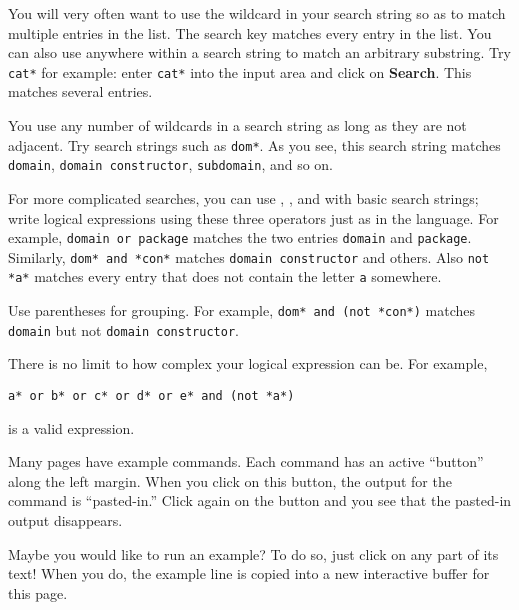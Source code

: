 You will very often want to use the wildcard \spadSyntax{*} in your search
string so as to match multiple entries in the list.
The search key \spadSyntax{*}  matches every entry in the list.
You can also use \spadSyntax{*} anywhere within a search string to match an
arbitrary substring.
Try {\tt cat*} for example:
enter {\tt cat*} into the input area and click on {\bf Search}.
This matches several entries.

You use any number of wildcards in a search string as long as they are
not adjacent.
Try search strings such as {\tt *dom*}.
As you see, this search string  matches {\tt domain}, {\tt domain
constructor}, {\tt subdomain}, and so on.


For more complicated searches, you can use
, , and 
with basic search strings;
write logical expressions using these three operators just as
in the \Language{} language.
For example, {\tt domain or package}  matches the two
entries {\tt domain} and {\tt package}.
Similarly, {\tt dom* and *con*} matches {\tt domain constructor}
and others.
Also {\tt not *a*} matches every entry that does not contain
the letter {\tt a} somewhere.

Use parentheses for grouping.
For example, {\tt dom* and (not *con*)}
matches {\tt domain} but not {\tt domain constructor}.

There is no limit to how complex your logical expression can be.
For example,
\begin{center}
{\tt a* or b* or c* or d* or e* and (not *a*)}
\end{center}
is a valid expression.

%
Many pages have \Language{} example commands.
%
%
Each command has an active ``button'' along the left margin.
When you click on this button, the output for the command is
``pasted-in.''
Click again on the button and you see that the pasted-in output
disappears.

Maybe you would like to run an example?
To do so, just click on any part of its text!
When you do, the example line is copied into a new interactive
\Language{} buffer for this \HyperName{} page.

